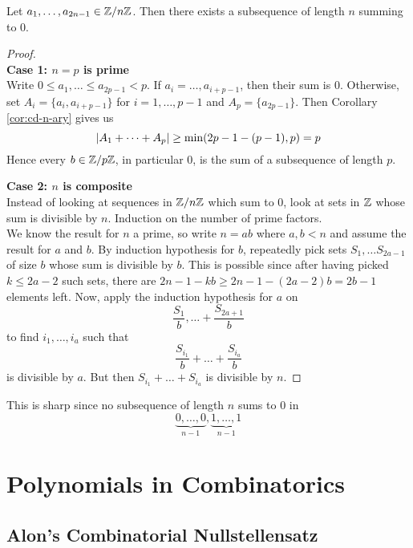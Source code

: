 \documentclass{article}
\begin{document}
\newlec

\begin{nthm}
  Let $a_1, \dots, a_{2n - 1} \in \mathbb Z/n\mathbb Z$. Then there exists a subsequence of length $n$ summing to $0$.
\end{nthm}
\begin{proof}~\\
  {\bf Case 1: $n = p$ is prime} \\
  Write $0 \le a_1, \dots \le a_{2p - 1} < p$. If $a_i = \dots, a_{i + p - 1}$, then their sum is $0$. Otherwise, set $A_i = \{a_i, a_{i + p - 1}\}$ for $i = 1, \dots, p - 1$ and $A_p = \{a_{2p - 1}\}$. Then Corollary \ref{cor:cd-n-ary} gives us
  $$\left\lvert A_1 + \dots + A_p\right\rvert \ge \min(2p - 1 - (p - 1), p) = p$$
  Hence every $b \in \mathbb Z/p\mathbb Z$, in particular $0$, is the sum of a subsequence of length $p$.

  {\bf Case 2: $n$ is composite} \\
  Instead of looking at sequences in $\mathbb Z/n\mathbb Z$ which sum to $0$, look at sets in $\mathbb Z$ whose sum is divisible by $n$. Induction on the number of prime factors. \\
  We know the result for $n$ a prime, so write $n = ab$ where $a, b < n$ and assume the result for $a$ and $b$. By induction hypothesis for $b$, repeatedly pick sets $S_1, \dots S_{2a - 1}$ of size $b$ whose sum is divisible by $b$. This is possible since after having picked $k \le 2a - 2$ such sets, there are $2n - 1 - kb \ge 2n - 1 - (2a - 2)b = 2b - 1$ elements left. Now, apply the induction hypothesis for $a$ on
  $$\frac{S_1}b, \dots + \frac{S_{2a + 1}}b$$
  to find $i_1, \dots, i_a$ such that
  $$\frac{S_{i_1}}b + \dots + \frac{S_{i_a}}b$$
  is divisible by $a$. But then $S_{i_1} + \dots + S_{i_a}$ is divisible by $n$.
\end{proof}
\begin{rmk}
  This is sharp since no subsequence of length $n$ sums to $0$ in
  $$\underbrace{0, \dots, 0}_{n - 1}, \underbrace{1, \dots, 1}_{n - 1}$$
\end{rmk}

\clearpage

\section{Polynomials in Combinatorics}

\subsection{Alon's Combinatorial Nullstellensatz}
\end{document}
